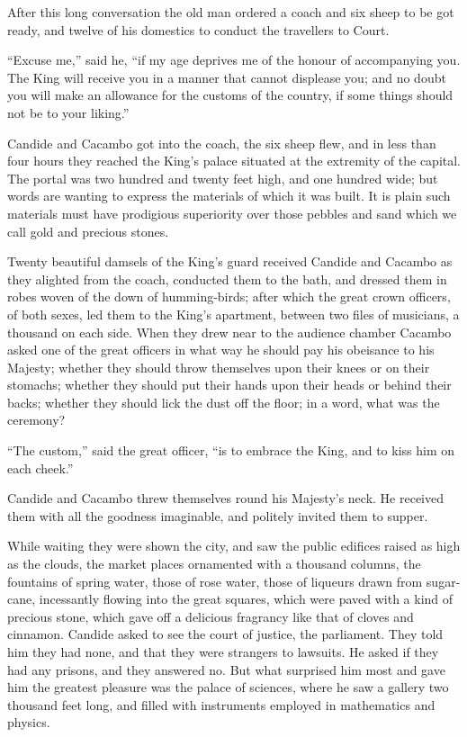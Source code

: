 After this long conversation the old man ordered a coach and six sheep to be got ready, and twelve of his domestics to conduct the travellers to Court.

``Excuse me,'' said he, ``if my age deprives me of the honour of accompanying you. The King will receive you in a manner that cannot displease you; and no doubt you will make an allowance for the customs of the country, if some things should not be to your liking.''

Candide and Cacambo got into the coach, the six sheep flew, and in less than four hours they reached the King's palace situated at the extremity of the capital. The portal was two hundred and twenty feet high, and one hundred wide; but words are wanting to express the materials of which it was built. It is plain such materials must have prodigious superiority over those pebbles and sand which we call gold and precious stones.

Twenty beautiful damsels of the King's guard received Candide and Cacambo as they alighted from the coach, conducted them to the bath, and dressed them in robes woven of the down of humming-birds; after which the great crown officers, of both sexes, led them to the King's apartment, between two files of musicians, a thousand on each side. When they drew near to the audience chamber Cacambo asked one of the great officers in what way he should pay his obeisance to his Majesty; whether they should throw themselves upon their knees or on their stomachs; whether they should put their hands upon their heads or behind their backs; whether they should lick the dust off the floor; in a word, what was the ceremony?

``The custom,'' said the great officer, ``is to embrace the King, and to kiss him on each cheek.''

Candide and Cacambo threw themselves round his Majesty's neck. He received them with all the goodness imaginable, and politely invited them to supper.

While waiting they were shown the city, and saw the public edifices raised as high as the clouds, the market places ornamented with a thousand columns, the fountains of spring water, those of rose water, those of liqueurs drawn from sugar-cane, incessantly flowing into the great squares, which were paved with a kind of precious stone, which gave off a delicious fragrancy like that of cloves and cinnamon. Candide asked to see the court of justice, the parliament. They told him they had none, and that they were strangers to lawsuits. He asked if they had any prisons, and they answered no. But what surprised him most and gave him the greatest pleasure was the palace of sciences, where he saw a gallery two thousand feet long, and filled with instruments employed in mathematics and physics.

